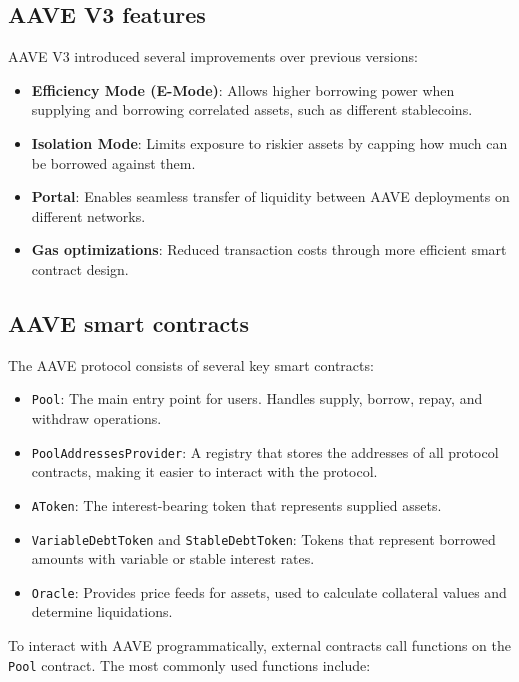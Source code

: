 \subsection{AAVE V3 features}

AAVE V3 introduced several improvements over previous versions:

\begin{itemize}
    \item \textbf{Efficiency Mode (E-Mode)}: Allows higher borrowing power when supplying and borrowing correlated assets, such as different stablecoins.
    \item \textbf{Isolation Mode}: Limits exposure to riskier assets by capping how much can be borrowed against them.
    \item \textbf{Portal}: Enables seamless transfer of liquidity between AAVE deployments on different networks.
    \item \textbf{Gas optimizations}: Reduced transaction costs through more efficient smart contract design.
\end{itemize}

\subsection{AAVE smart contracts}

The AAVE protocol consists of several key smart contracts:

\begin{itemize}
    \item \texttt{Pool}: The main entry point for users. Handles supply, borrow, repay, and withdraw operations.
    \item \texttt{PoolAddressesProvider}: A registry that stores the addresses of all protocol contracts, making it easier to interact with the protocol.
    \item \texttt{AToken}: The interest-bearing token that represents supplied assets.
    \item \texttt{VariableDebtToken} and \texttt{StableDebtToken}: Tokens that represent borrowed amounts with variable or stable interest rates.
    \item \texttt{Oracle}: Provides price feeds for assets, used to calculate collateral values and determine liquidations.
\end{itemize}

To interact with AAVE programmatically, external contracts call functions on the \texttt{Pool} contract. The most commonly used functions include:

